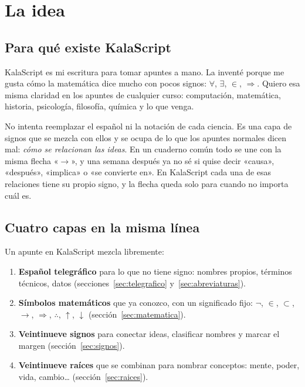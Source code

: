 \section{La idea}\label{sec:idea}

\subsection{Para qué existe KalaScript}
KalaScript es mi escritura para tomar apuntes a mano. La inventé porque me
gusta cómo la matemática dice mucho con pocos signos: \(\forall\), \(\exists\),
\(\in\), \(\Rightarrow\). Quiero esa misma claridad en los apuntes de cualquier curso:
computación, matemática, historia, psicología, filosofía, química y lo que venga.

No intenta reemplazar el español ni la notación de cada ciencia. Es una capa
de signos que se mezcla con ellos y se ocupa de lo que los apuntes normales
dicen mal: \emph{cómo se relacionan las ideas}. En un cuaderno común todo se
une con la misma flecha «\(\to\)», y una semana después ya no sé si quise decir
«causa», «después», «implica» o «se convierte en». En KalaScript cada una de
esas relaciones tiene su propio signo, y la flecha queda solo para cuando no
importa cuál es.

\subsection{Cuatro capas en la misma línea}
Un apunte en KalaScript mezcla libremente:
\begin{enumerate}
\item \textbf{Español telegráfico} para lo que no tiene signo: nombres propios,
 términos técnicos, datos (secciones~\ref{sec:telegrafico} y~\ref{sec:abreviaturas}).
\item \textbf{Símbolos matemáticos} que ya conozco, con un significado fijo:
 \(\neg\), \(\in\), \(\subset\), \(\to\), \(\Rightarrow\), \(\therefore\), \(\uparrow\), \(\downarrow\)
 (sección~\ref{sec:matematica}).
\item \textbf{Veintinueve signos} para conectar ideas, clasificar nombres
 y marcar el margen (sección~\ref{sec:signos}).
\item \textbf{Veintinueve raíces} que se combinan para nombrar conceptos:
 mente, poder, vida, cambio\ldots{} (sección~\ref{sec:raices}).
\end{enumerate}

\begin{apunte}
\end{apunte}

